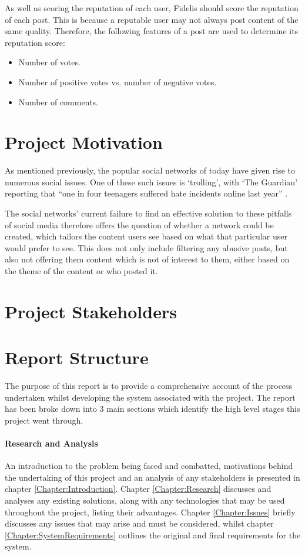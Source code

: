 As well as scoring the reputation of each user, Fidelis should score the reputation of each post. This is because a reputable user may not always post content of the same quality. Therefore, the following features of a post are used to determine its reputation score:

\begin{itemize}
\item Number of votes.
\item Number of positive votes vs. number of negative votes.
\item Number of comments.
\end{itemize}

\section{Project Motivation}
As mentioned previously, the popular social networks of today have given rise to numerous social issues. One of these such issues is `trolling', with `The Guardian' reporting that ``one in four teenagers suffered hate incidents online last year'' \cite{Gani:Trolling}. 

The social networks' current failure to find an effective solution to these pitfalls of social media therefore offers the question of whether a network could be created, which tailors the content users see based on what that particular user would prefer to see. This does not only include filtering any abusive posts, but also not offering them content which is not of interest to them, either based on the theme of the content or who posted it.

\section{Project Stakeholders}

\section{Report Structure}
The purpose of this report is to provide a comprehensive account of the process undertaken whilst developing the system associated with the project. The report has been broke down into 3 main sections which identify the high level stages this project went through.

\paragraph{Research and Analysis}
An introduction to the problem being faced and combatted, motivations behind the undertaking of this project and an analysis of any stakeholders is presented in chapter \ref{Chapter:Introduction}. Chapter \ref{Chapter:Research} discusses and analyses any existing solutions, along with any technologies that may be used throughout the project, listing their advantages. Chapter \ref{Chapter:Issues} briefly discusses any issues that may arise and must be considered, whilst chapter \ref{Chapter:SystemRequirements} outlines the original and final requirements for the system.

